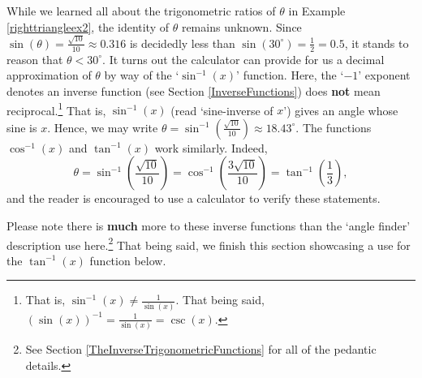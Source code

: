 \documentclass{ximera}
\begin{document}
While we learned all about the trigonometric ratios of $\theta$ in Example \ref{righttriangleex2}, the identity of $\theta$ remains unknown.  Since $\sin(\theta) = \frac{\sqrt{10}}{10} \approx 0.316 $ is decidedly less than $\sin\left(30^{\circ}\right) = \frac{1}{2} = 0.5$, it stands to reason that $\theta < 30^{\circ}$. It turns out the calculator can provide for us a decimal approximation of $\theta$ by way of the `$\sin^{-1}(x)$' function.  Here, the `$-1$' exponent denotes an inverse function (see Section \ref{InverseFunctions}) does \textbf{not} mean reciprocal.\footnote{That is, $\sin^{-1}(x) \neq \frac{1}{\sin(x)} $.  That being said, $(\sin(x))^{-1} = \frac{1}{\sin(x)} = \csc(x)$.}  That is, $\sin^{-1}(x)$ (read `sine-inverse of $x$') gives an angle whose sine is $x$.  Hence, we may write $\theta = \sin^{-1}\left(\frac{\sqrt{10}}{10}\right) \approx 18.43^{\circ}$.  The functions $\cos^{-1}(x)$ and $\tan^{-1}(x)$ work similarly.  Indeed, \[ \theta = \sin^{-1}\left(\frac{\sqrt{10}}{10}\right)  = \cos^{-1}\left(\frac{3 \sqrt{10}}{10}\right)  = \tan^{-1} \left( \frac{1}{3} \right),\] and the reader is encouraged to use a calculator to verify these statements.

\smallskip

Please note there is \textbf{much} more to these inverse functions than the `angle finder' description use here.\footnote{See Section \ref{TheInverseTrigonometricFunctions} for all of the pedantic details.}  That being said, we finish this section showcasing a use for the $\tan^{-1}(x)$ function below.
\end{document}
